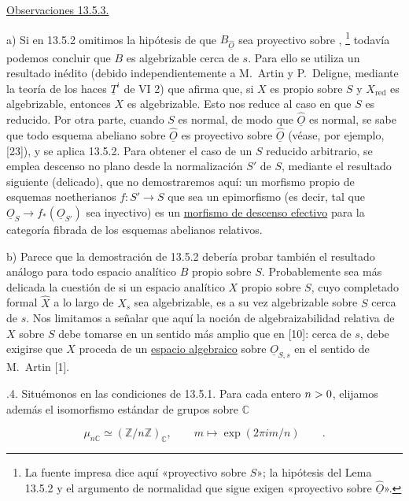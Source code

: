 \medskip
\noindent
\underline{Observaciones 13.5.3.}

\smallskip
\noindent
a) Si en 13.5.2 omitimos la hipótesis de que
$B_{\hat{\underline O}}$ sea proyectivo sobre
,
\footnote{La fuente impresa dice aquí «proyectivo sobre $S$»; la
hipótesis del Lema 13.5.2 y el argumento de normalidad que sigue exigen
«proyectivo sobre $\hat{\underline O}$».}
todavía podemos concluir que $B$ es algebrizable cerca de $s$. Para
ello se utiliza un resultado inédito (debido independientemente a
M.~Artin y P.~Deligne, mediante la teoría de los haces $\underline T^i$
de VI 2) que afirma que, si $X$ es propio sobre $S$ y
$X_{\mathrm{red}}$ es algebrizable, entonces $X$ es algebrizable. Esto
nos reduce al caso en que $S$ es reducido. Por otra parte, cuando $S$
es normal, de modo que $\hat{\underline O}$ es normal, se sabe que todo
esquema abeliano sobre $\hat{\underline O}$ es proyectivo sobre
$\hat{\underline O}$ (véase, por ejemplo, [23]), y se aplica 13.5.2.
Para obtener el caso de un $S$ reducido arbitrario, se emplea descenso
no plano desde la normalización $S'$ de $S$, mediante el resultado
siguiente (delicado), que no demostraremos aquí: un morfismo propio de
esquemas noetherianos $f:S'\longrightarrow S$ que sea un epimorfismo
(es decir, tal que
$\underline O_S\longrightarrow f_*(\underline O_{S'})$ sea inyectivo)
es un \underline{morfismo de descenso efectivo} para la categoría
fibrada de los esquemas abelianos relativos.

\smallskip
\noindent
b) Parece que la demostración de 13.5.2 debería probar también el
resultado análogo para todo espacio analítico $B$ propio sobre $S$.
Probablemente sea más delicada la cuestión de si un espacio analítico
$X$ propio sobre $S$, cuyo completado formal $\hat X$ a lo largo de
$X_s$ sea algebrizable, es a su vez algebrizable sobre $S$ cerca de
$s$. Nos limitamos a señalar que aquí la noción de algebraizabilidad
relativa de $X$ sobre $S$ debe tomarse en un sentido más amplio que en
[10]: cerca de $s$, debe exigirse que $X$ proceda de un
\underline{espacio algebraico} sobre $\underline O_{S,s}$ en el sentido
de M.~Artin [1].

\medskip
{}.4. Situémonos en las condiciones de 13.5.1. Para cada entero
$n>\sisi{C}{0}$, elijamos además el isomorfismo estándar de grupos sobre
$\mathbb C$

\begin{equation*}
 \mu_{n\mathbb C}\simeq(\mathbb Z/n\mathbb Z)_{\mathbb C},
 \qquad m\longmapsto\exp(2\pi i m/n)\qquad .
\end{equation*}

